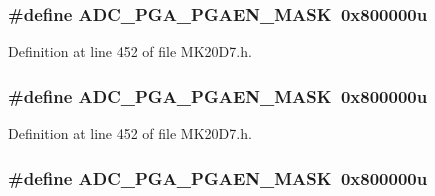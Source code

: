 \subsubsection[{\texorpdfstring{A\+D\+C\+\_\+\+P\+G\+A\+\_\+\+P\+G\+A\+E\+N\+\_\+\+M\+A\+SK}{ADC_PGA_PGAEN_MASK}}]{\setlength{\rightskip}{0pt plus 5cm}\#define A\+D\+C\+\_\+\+P\+G\+A\+\_\+\+P\+G\+A\+E\+N\+\_\+\+M\+A\+SK~0x800000u}\hypertarget{group___a_d_c___register___masks_ga43041669f7d4bc8d046ed58fd9074e2b}{}\label{group___a_d_c___register___masks_ga43041669f7d4bc8d046ed58fd9074e2b}


Definition at line 452 of file M\+K20\+D7.\+h.

\subsubsection[{\texorpdfstring{A\+D\+C\+\_\+\+P\+G\+A\+\_\+\+P\+G\+A\+E\+N\+\_\+\+M\+A\+SK}{ADC_PGA_PGAEN_MASK}}]{\setlength{\rightskip}{0pt plus 5cm}\#define A\+D\+C\+\_\+\+P\+G\+A\+\_\+\+P\+G\+A\+E\+N\+\_\+\+M\+A\+SK~0x800000u}\hypertarget{group___a_d_c___register___masks_ga43041669f7d4bc8d046ed58fd9074e2b}{}\label{group___a_d_c___register___masks_ga43041669f7d4bc8d046ed58fd9074e2b}


Definition at line 452 of file M\+K20\+D7.\+h.

\subsubsection[{\texorpdfstring{A\+D\+C\+\_\+\+P\+G\+A\+\_\+\+P\+G\+A\+E\+N\+\_\+\+M\+A\+SK}{ADC_PGA_PGAEN_MASK}}]{\setlength{\rightskip}{0pt plus 5cm}\#define A\+D\+C\+\_\+\+P\+G\+A\+\_\+\+P\+G\+A\+E\+N\+\_\+\+M\+A\+SK~0x800000u}\hypertarget{group___a_d_c___register___masks_ga43041669f7d4bc8d046ed58fd9074e2b}{}\label{group___a_d_c___register___masks_ga43041669f7d4bc8d046ed58fd9074e2b}


